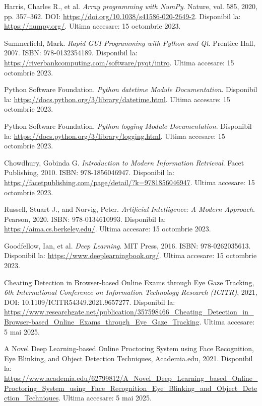 \documentclass[12pt,a4paper]{article}
\begin{document}
\begin{thebibliography}{9}
Harris, Charles R., et al. 
\textit{Array programming with NumPy}. 
Nature, vol. 585, 2020, pp. 357–362. 
DOI: \url{https://doi.org/10.1038/s41586-020-2649-2}. 
Disponibil la: \url{https://numpy.org/}. 
Ultima accesare: 15 octombrie 2023.

Summerfield, Mark. 
\textit{Rapid GUI Programming with Python and Qt}. 
Prentice Hall, 2007. 
ISBN: 978-0132354189. 
Disponibil la: \url{https://riverbankcomputing.com/software/pyqt/intro}. 
Ultima accesare: 15 octombrie 2023.

Python Software Foundation. 
\textit{Python datetime Module Documentation}. 
Disponibil la: \url{https://docs.python.org/3/library/datetime.html}. 
Ultima accesare: 15 octombrie 2023.

Python Software Foundation. 
\textit{Python logging Module Documentation}. 
Disponibil la: \url{https://docs.python.org/3/library/logging.html}. 
Ultima accesare: 15 octombrie 2023.

Chowdhury, Gobinda G. 
\textit{Introduction to Modern Information Retrieval}. 
Facet Publishing, 2010. 
ISBN: 978-1856046947. 
Disponibil la: \url{https://facetpublishing.com/page/detail/?k=9781856046947}. 
Ultima accesare: 15 octombrie 2023.

Russell, Stuart J., and Norvig, Peter. 
\textit{Artificial Intelligence: A Modern Approach}. 
Pearson, 2020. 
ISBN: 978-0134610993. 
Disponibil la: \url{https://aima.cs.berkeley.edu/}. 
Ultima accesare: 15 octombrie 2023.

Goodfellow, Ian, et al. 
\textit{Deep Learning}. 
MIT Press, 2016. 
ISBN: 978-0262035613. 
Disponibil la: \url{https://www.deeplearningbook.org/}. 
Ultima accesare: 15 octombrie 2023.

Cheating Detection in Browser-based Online Exams through Eye Gaze Tracking,
\textit{6th International Conference on Information Technology Research (ICITR)},
2021,
DOI: 10.1109/ICITR54349.2021.9657277.
Disponibil la: \url{https://www.researchgate.net/publication/357598466_Cheating_Detection_in_Browser-based_Online_Exams_through_Eye_Gaze_Tracking}.
Ultima accesare: 5 mai 2025.

A Novel Deep Learning-based Online Proctoring System using Face Recognition, Eye Blinking, and Object Detection Techniques,
Academia.edu,
2021.
Disponibil la: \url{https://www.academia.edu/62799812/A_Novel_Deep_Learning_based_Online_Proctoring_System_using_Face_Recognition_Eye_Blinking_and_Object_Detection_Techniques}.
Ultima accesare: 5 mai 2025.


\end{thebibliography}
\end{document}
